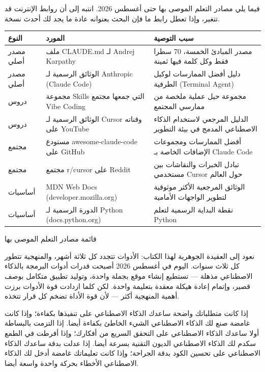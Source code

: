 
فيما يلي مصادر التعلم الموصى بها حتى أغسطس 2026. انتبه إلى أن روابط الإنترنت قد تتغير، وإذا تعطل رابط ما فإن البحث بعنوانه عادة ما يجد لك أحدث نسخة.

\begin{center}
\begin{tabularx}{\linewidth}{|X|X|X|}
\hline
\textbf{النوع} & \textbf{المورد} & \textbf{سبب التوصية} \tabularnewline
\hline
مصدر أصلي & ملف CLAUDE.md لـ Andrej Karpathy & مصدر المبادئ الخمسة، 70 سطرا فقط وكل كلمة فيها ثمينة \tabularnewline
مصدر أصلي & الوثائق الرسمية لـ Anthropic (Claude Code) & دليل أفضل الممارسات لوكيل الطرفية (Terminal Agent) \tabularnewline
دروس & مجموعة Skills التي جمعها مجتمع Vibe Coding & مجموعة حيل عملية ملخصة من ممارسي المجتمع \tabularnewline
دروس & الوثائق الرسمية لـ Cursor وقناته على YouTube & الدليل المرجعي لاستخدام الذكاء الاصطناعي المدمج في بيئة التطوير \tabularnewline
مجتمع & مستودع awesome-claude-code على GitHub & أفضل الممارسات ومجموعات الإضافات الخاصة بـ Claude Code \tabularnewline
مجتمع & مجتمع r/cursor على Reddit & تبادل الخبرات والنقاشات بين مستخدمي Cursor حول العالم \tabularnewline
أساسيات & MDN Web Docs (developer.mozilla.org) & الوثائق المرجعية الأكثر موثوقية لتطوير الواجهات الأمامية \tabularnewline
أساسيات & الدورة الرسمية لـ Python (docs.python.org) & نقطة البداية الرسمية لتعلم Python \tabularnewline
\hline
\end{tabularx}
\end{center}

\begin{center}\small\color{gray}قائمة مصادر التعلم الموصى بها\end{center}


نعود إلى العقيدة الجوهرية لهذا الكتاب: الأدوات تتجدد كل ثلاثة أشهر، والمنهجية تتطور كل ثلاث سنوات. اليوم في أغسطس 2026 أصبحت قدرات أدوات البرمجة بالذكاء الاصطناعي مذهلة — تستطيع إنشاء موقع بجملة واحدة، وتوليد تطبيق متكامل بوصف قصير، وإتمام إعادة هيكلة معقدة بتعليمة واحدة. لكن كلما ازدادت قوة الأدوات برزت أهمية المنهجية أكثر — لأن قوة الأداة تضخم كل قرار تتخذه.

إذا كانت متطلباتك واضحة ساعدك الذكاء الاصطناعي على تنفيذها بكفاءة؛ وإذا كانت غامضة صنع لك الذكاء الاصطناعي الشيء الخاطئ بكفاءة أيضا. إذا التزمت بالبساطة أولا ساعدك الذكاء الاصطناعي على التحقق السريع من أفكارك؛ وإذا أفرطت في الطمع سكدم لك الذكاء الاصطناعي الديون التقنية بسرعة أيضا. إذا عدلت بدقة ساعدك الذكاء الاصطناعي على تحسين الكود بدقة الجراحة؛ وإذا كانت تعليماتك غامضة أدخل لك الذكاء الاصطناعي الأخطاء بحركة واحدة واسعة أيضا.

